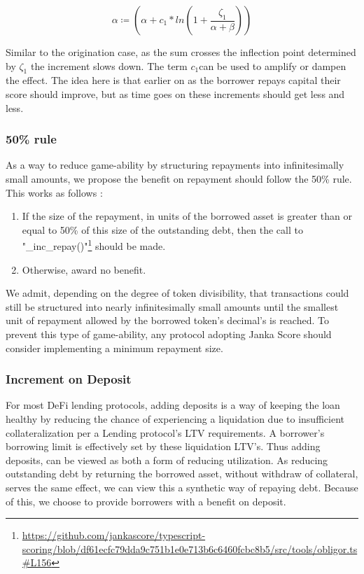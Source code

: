 \documentclass{article}
\begin{document}
\begin{equation}
\alpha \coloneqq (\alpha + c_1*ln(1 + \frac{\zeta_1}{\alpha+\beta}))
\end{equation}

Similar to the origination case, as the sum crosses the inflection point determined by $\zeta_1$ the increment slows down. The term $c_1$can be used to amplify or dampen the effect. The idea here is that earlier on as the borrower repays capital their score should improve, but as time goes on these increments should get less and less.

\subsubsection{50\% rule}
As a way to reduce game-ability by structuring repayments into infinitesimally small amounts, we propose the benefit on repayment should follow the 50\% rule. This works as follows :
\begin{enumerate}
    \item If the size of the repayment, in units of the borrowed asset is greater than or equal to 50\% of this size of the outstanding debt, then the call to "\_inc\_repay()"\footnote{\url{https://github.com/jankascore/typescript-scoring/blob/df61ecfc79dda9c751b1e0e713b6c6460fcbc8b5/src/tools/obligor.ts\#L156}} should be made.
    \item Otherwise, award no benefit.
\end{enumerate}

We admit, depending on the degree of token divisibility, that transactions could still be structured into nearly infinitesimally small amounts until the smallest unit of repayment allowed by the borrowed token's decimal's is reached. To prevent this type of game-ability, any protocol adopting Janka Score should consider implementing a minimum repayment size.

\subsubsection{Increment on Deposit}
For most DeFi lending protocols, adding deposits is a way of keeping the loan healthy by reducing the chance of experiencing a liquidation due to insufficient collateralization per a Lending protocol's LTV requirements. A borrower's borrowing limit is effectively set by these liquidation LTV's. Thus adding deposits, can be viewed as both a form of reducing utilization. As reducing outstanding debt by returning the borrowed asset, without withdraw of collateral, serves the same effect, we can view this a synthetic way of repaying debt. Because of this, we choose to provide borrowers with a benefit on deposit.
\end{document}
